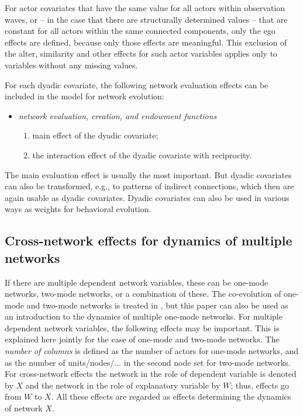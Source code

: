 \documentclass[a4paper,fleqn,11pt]{article}
\newcommand{\+}{\, + \,}
\begin{document}
For actor covariates that have the same value for all actors within observation
waves,
or -- in the case that there are structurally determined values --
that are constant for all actors within the same connected components,
only the ego effects are defined, because only those
effects are meaningful.
This exclusion of the alter, similarity and other effects for
such actor variables applies only to variables without any missing values.

For each dyadic covariate, the following network evaluation effects
can be included in the model for network evolution:
\begin{itemize}
\item {\em network evaluation, creation, and endowment functions}
\begin{enumerate}
\item main effect of the dyadic covariate;
\item the interaction effect of the dyadic covariate with reciprocity.
\end{enumerate}
\end{itemize}
The main evaluation effect is usually the most important.
But dyadic covariates can also be transformed, e.g., to patterns
of indirect connections, which then are again usable as dyadic covariates.
Dyadic covariates can also be used in various ways as weights
for behavioral evolution.

\subsection{Cross-network effects for dynamics of multiple networks}


If there are multiple dependent network variables, these can be
one-mode networks, two-mode networks, or a combination of these.
The co-evolution of one-mode and two-mode networks is treated in
\citet{SLT2013}, but this paper can also be used as an introduction
to the dynamics of multiple one-mode networks.
For multiple dependent network variables,
the following effects may be important.
This is explained here jointly for the case of one-mode and two-mode
networks. The \emph{number of columns} is defined as the number of actors
for one-mode networks, and as the number of units/nodes/...
in the second node set for two-mode networks.
For cross-network effects the network in the role of dependent variable
is denoted by $X$ and the network in the role of explanatory variable
by $W$; thus, effects go from $W$ to $X$.
All these effects are regarded as effects determining the dynamics of network $X$.
\end{document}
